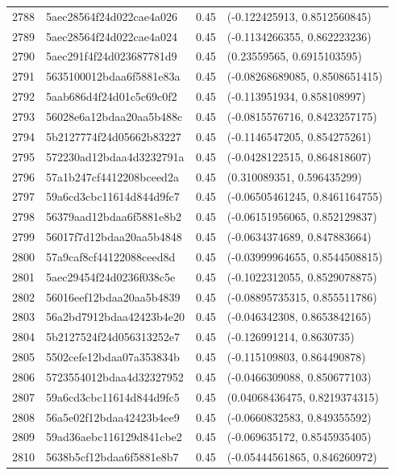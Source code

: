 \begin{table}[ht]
\begin{tabular}{rlrl}
  2788 & 5aec28564f24d022cae4a026 & 0.45 & (-0.122425913, 0.8512560845) \\ 
  2789 & 5aec28564f24d022cae4a024 & 0.45 & (-0.1134266355, 0.862223236) \\ 
  2790 & 5aec291f4f24d023687781d9 & 0.45 & (0.23559565, 0.6915103595) \\ 
  2791 & 5635100012bdaa6f5881e83a & 0.45 & (-0.08268689085, 0.8508651415) \\ 
  2792 & 5aab686d4f24d01c5c69c0f2 & 0.45 & (-0.113951934, 0.858108997) \\ 
  2793 & 56028e6a12bdaa20aa5b488c & 0.45 & (-0.0815576716, 0.8423257175) \\ 
  2794 & 5b2127774f24d05662b83227 & 0.45 & (-0.1146547205, 0.854275261) \\ 
  2795 & 572230ad12bdaa4d3232791a & 0.45 & (-0.0428122515, 0.864818607) \\ 
  2796 & 57a1b247cf4412208bceed2a & 0.45 & (0.310089351, 0.596435299) \\ 
  2797 & 59a6cd3cbc11614d844d9fc7 & 0.45 & (-0.06505461245, 0.8461164755) \\ 
  2798 & 56379aad12bdaa6f5881e8b2 & 0.45 & (-0.06151956065, 0.852129837) \\ 
  2799 & 56017f7d12bdaa20aa5b4848 & 0.45 & (-0.0634374689, 0.847883664) \\ 
  2800 & 57a9caf8cf44122088ceed8d & 0.45 & (-0.03999964655, 0.8544508815) \\ 
  2801 & 5aec29454f24d0236f038c5e & 0.45 & (-0.1022312055, 0.8529078875) \\ 
  2802 & 56016eef12bdaa20aa5b4839 & 0.45 & (-0.08895735315, 0.855511786) \\ 
  2803 & 56a2bd7912bdaa42423b4e20 & 0.45 & (-0.046342308, 0.8653842165) \\ 
  2804 & 5b2127524f24d056313252e7 & 0.45 & (-0.126991214, 0.8630735) \\ 
  2805 & 5502cefe12bdaa07a353834b & 0.45 & (-0.115109803, 0.864490878) \\ 
  2806 & 5723554012bdaa4d32327952 & 0.45 & (-0.0466309088, 0.850677103) \\ 
  2807 & 59a6cd3cbc11614d844d9fc5 & 0.45 & (0.04068436475, 0.8219374315) \\ 
  2808 & 56a5e02f12bdaa42423b4ee9 & 0.45 & (-0.0660832583, 0.849355592) \\ 
  2809 & 59ad36aebc116129d841cbe2 & 0.45 & (-0.069635172, 0.8545935405) \\ 
  2810 & 5638b5cf12bdaa6f5881e8b7 & 0.45 & (-0.05444561865, 0.846260972) \\ 

\end{tabular}
\end{table}
